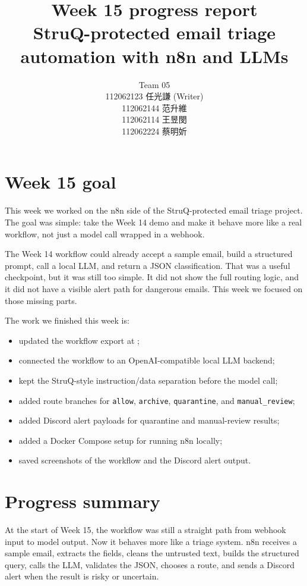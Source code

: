 \documentclass[11pt,a4paper]{article}
\title{\textbf{Week 15 progress report}\\
\large StruQ-protected email triage automation with n8n and LLMs}
\author{
Team 05\\
112062123 任光謙 (Writer)\\
112062144 范升維\\
112062114 王昱閔\\
112062224 蔡明妡
}
\begin{document}
\maketitle

\section{Week 15 goal}

This week we worked on the n8n side of the StruQ-protected email triage project.
The goal was simple: take the Week 14 demo and make it behave more like a real
workflow, not just a model call wrapped in a webhook.

The Week 14 workflow could already accept a sample email, build a structured
prompt, call a local LLM, and return a JSON classification. That was a useful
checkpoint, but it was still too simple. It did not show the full routing logic,
and it did not have a visible alert path for dangerous emails. This week we
focused on those missing parts.

The work we finished this week is:

\begin{itemize}
  \item updated the workflow export at ;
  \item connected the workflow to an OpenAI-compatible local LLM backend;
  \item kept the StruQ-style instruction/data separation before the model call;
  \item added route branches for \texttt{allow}, \texttt{archive}, \texttt{quarantine}, and \texttt{manual\_review};
  \item added Discord alert payloads for quarantine and manual-review results;
  \item added a Docker Compose setup for running n8n locally;
  \item saved screenshots of the workflow and the Discord alert output.
\end{itemize}

\section{Progress summary}

At the start of Week 15, the workflow was still a straight path from webhook
input to model output. Now it behaves more like a triage system. n8n receives a
sample email, extracts the fields, cleans the untrusted text, builds the
structured query, calls the LLM, validates the JSON, chooses a route, and sends
a Discord alert when the result is risky or uncertain.
\end{document}
